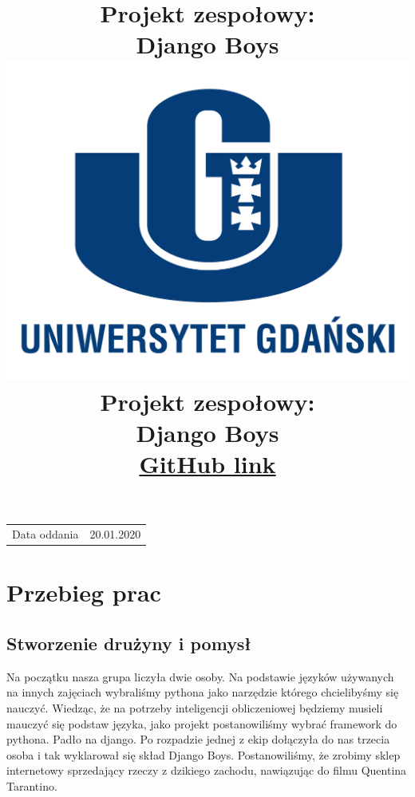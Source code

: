 \documentclass{article}
\title{Projekt zespołowy:\\Django Boys\\} %
\author{}
\date{}
\begin{document}
\title{\includegraphics[scale=0.7]{UG.jpg}\\[2cm]{Projekt zespołowy:\\Django Boys \\[10cm] \href{https://github.com/DjangoBo/Python}{GitHub link}}}
\maketitle

\begin{center}
\begin{tabular}{l r}
Data oddania & 20.01.2020 \\ 
\end{tabular}
\end{center}


\newpage
\Large

\tableofcontents



\newpage


\section{Przebieg prac}

\subsection{Stworzenie drużyny i pomysł}
\parindent24pt Na początku nasza grupa liczyła dwie osoby. Na podstawie języków używanych na innych zajęciach wybraliśmy pythona jako narzędzie którego chcielibyśmy się nauczyć. Wiedząc, że na potrzeby inteligencji obliczeniowej będziemy musieli mauczyć się podstaw języka, jako projekt postanowiliśmy wybrać framework do pythona. Padło na django. Po rozpadzie jednej z ekip dołączyła do nas trzecia osoba i tak wyklarował się skład Django Boys. Postanowiliśmy, że zrobimy sklep internetowy sprzedający rzeczy z dzikiego zachodu, nawiązując do filmu Quentina Tarantino.
\end{document}
